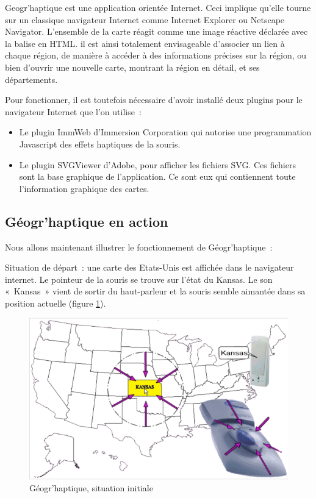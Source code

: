 \documentclass[
]{book}
\providecommand{\tightlist}{%
  \setlength{\itemsep}{0pt}\setlength{\parskip}{0pt}}
\begin{document}
Geogr'haptique est une application orientée Internet. Ceci implique
qu'elle tourne sur un classique navigateur Internet comme Internet Explorer
ou Netscape Navigator. L'ensemble de la carte réagit comme une image réactive
déclarée avec la balise en HTML. il est ainsi totalement
envisageable d'associer un lien à chaque région, de manière à accéder à des
informations précises sur la région, ou bien d'ouvrir une nouvelle carte,
montrant la région en détail, et ses départements.

Pour fonctionner, il est toutefois nécessaire d'avoir installé deux
plugins pour le navigateur Internet que l'on utilise~:

\begin{itemize}
\tightlist
\item
  Le plugin ImmWeb d'Immersion Corporation qui
  autorise une programmation Javascript des effets haptiques de la
  souris.
\item
  Le plugin SVGViewer d'Adobe, pour afficher les
  fichiers SVG. Ces fichiers sont la base graphique de l'application. Ce sont
  eux qui contiennent toute l'information graphique des cartes.
\end{itemize}

\hypertarget{guxe9ogrhaptique-en-action}{%
\subsection{Géogr'haptique en action}\label{guxe9ogrhaptique-en-action}}

Nous allons maintenant illustrer le fonctionnement de
Géogr'haptique~:

Situation de départ~: une carte des Etats-Unis est affichée dans le
navigateur internet. Le pointeur de la souris se trouve sur l'état du Kansas.
Le son «~Kansas~» vient de sortir du haut-parleur et la souris
semble aimantée dans sa position actuelle (figure \ref{fig:initiale}).

\begin{figure}
\centering
\includegraphics{img/geo1.png}
\caption{\label{fig:initiale}Géogr'haptique, situation initiale}
\end{figure}
\end{document}
